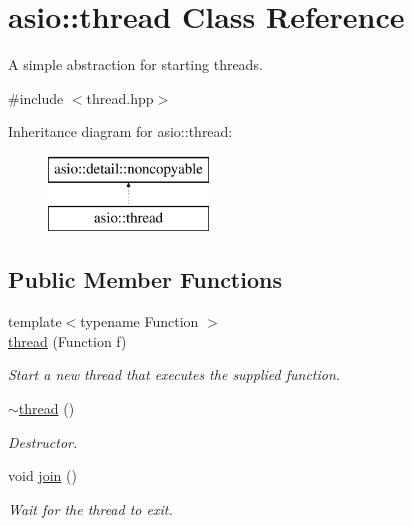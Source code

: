 \hypertarget{classasio_1_1thread}{}\section{asio\+:\+:thread Class Reference}
\label{classasio_1_1thread}


A simple abstraction for starting threads.  




{\ttfamily \#include $<$thread.\+hpp$>$}

Inheritance diagram for asio\+:\+:thread\+:\begin{figure}[H]
\begin{center}
\leavevmode
\includegraphics[height=2.000000cm]{classasio_1_1thread}
\end{center}
\end{figure}
\subsection*{Public Member Functions}
\begin{DoxyCompactItemize}
\item 
{\footnotesize template$<$typename Function $>$ }\\\hyperlink{classasio_1_1thread_aa95ee0c85cd4c4d61032ada1ad7b25d2}{thread} (Function f)
\begin{DoxyCompactList}\small\item\em Start a new thread that executes the supplied function. \end{DoxyCompactList}\item 
\hyperlink{classasio_1_1thread_a961abee6eb9ead8692936d97661a859b}{$\sim$thread} ()
\begin{DoxyCompactList}\small\item\em Destructor. \end{DoxyCompactList}\item 
void \hyperlink{classasio_1_1thread_a6c3ea0ac62ce8da7a21ed1a055b7b659}{join} ()
\begin{DoxyCompactList}\small\item\em Wait for the thread to exit. \end{DoxyCompactList}\end{DoxyCompactItemize}


